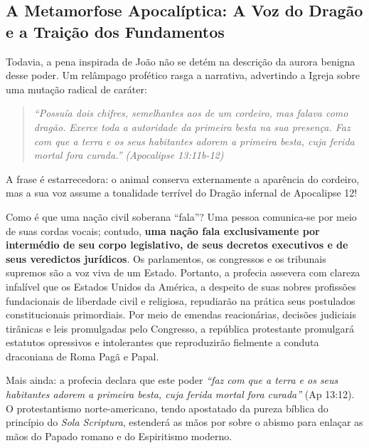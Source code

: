 \documentclass[11pt,a4paper,openany]{book}
\begin{document}
\subsection{A Metamorfose Apocalíptica: A Voz do Dragão e a Traição dos Fundamentos}


Todavia, a pena inspirada de João não se detém na descrição da aurora benigna desse poder. Um relâmpago profético rasga a narrativa, advertindo a Igreja sobre uma mutação radical de caráter:


\begin{quote}
\itshape \textit{``Possuía dois chifres, semelhantes aos de um cordeiro, mas falava como dragão. Exerce toda a autoridade da primeira besta na sua presença. Faz com que a terra e os seus habitantes adorem a primeira besta, cuja ferida mortal fora curada.''} (Apocalipse 13:11b-12)
\end{quote}


A frase é estarrecedora: o animal conserva externamente a aparência do cordeiro, mas a sua voz assume a tonalidade terrível do Dragão infernal de Apocalipse 12!

Como é que uma nação civil soberana ``fala''? Uma pessoa comunica-se por meio de suas cordas vocais; contudo, \textbf{uma nação fala exclusivamente por intermédio de seu corpo legislativo, de seus decretos executivos e de seus veredictos jurídicos}. Os parlamentos, os congressos e os tribunais supremos são a voz viva de um Estado. Portanto, a profecia assevera com clareza infalível que os Estados Unidos da América, a despeito de suas nobres profissões fundacionais de liberdade civil e religiosa, repudiarão na prática seus postulados constitucionais primordiais. Por meio de emendas reacionárias, decisões judiciais tirânicas e leis promulgadas pelo Congresso, a república protestante promulgará estatutos opressivos e intolerantes que reproduzirão fielmente a conduta draconiana de Roma Pagã e Papal.

Mais ainda: a profecia declara que este poder \textit{``faz com que a terra e os seus habitantes adorem a primeira besta, cuja ferida mortal fora curada''} (Ap 13:12). O protestantismo norte-americano, tendo apostatado da pureza bíblica do princípio do \textit{Sola Scriptura}, estenderá as mãos por sobre o abismo para enlaçar as mãos do Papado romano e do Espiritismo moderno.
\end{document}
